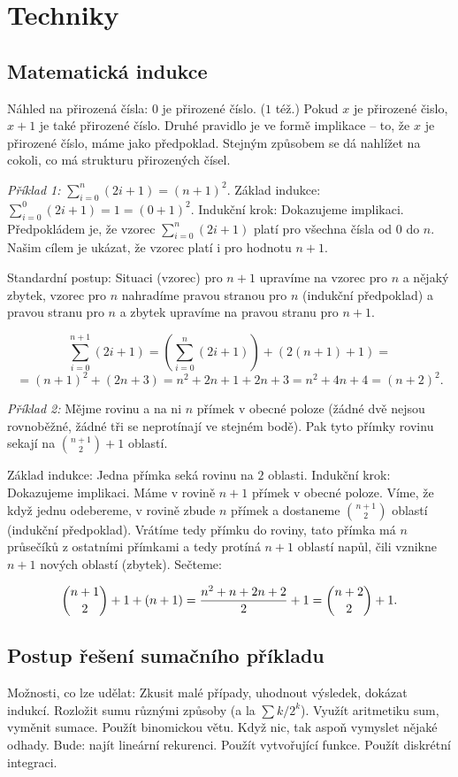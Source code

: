 \vfill\eject
\section{Techniky}

\subsection{Matematická indukce}

Náhled na přirozená čísla:
\itemize\ibull
\: $0$ je přirozené číslo. ($1$ též.)
\: Pokud $x$ je přirozené čislo, $x+1$ je také přirozené číslo.
\endlist
Druhé pravidlo je ve formě implikace -- to, že $x$ je přirozené číslo,
máme  jako předpoklad. Stejným způsobem se dá nahlížet na
cokoli, co má  strukturu přirozených čísel.

{\it Příklad 1:} $\sum_{i=0}^n (2i+1) = (n+1)^2$.
\itemize\ibull
\: Základ indukce: $\sum_{i=0}^0 (2i+1) = 1 = (0+1)^2$.
\: Indukční krok: Dokazujeme implikaci. Předpokládem je, že vzorec $\sum_{i=0}^n (2i+1)$ platí pro všechna čísla od $0$ do $n$. Našim cílem je ukázat, že vzorec platí i pro hodnotu $n+1$.

Standardní postup: Situaci (vzorec) pro $n+1$ upravíme na vzorec pro $n$ a nějaký zbytek,
vzorec pro $n$ nahradíme pravou stranou pro $n$ (indukční předpoklad) a pravou stranu pro $n$
a zbytek upravíme na pravou stranu pro $n+1$. 
\endlist

$$ \sum_{i=0}^{n+1} (2i+1) = \left( \sum_{i=0}^n (2i+1) \right) + \left(2(n+1)+1\right) = $$
$$ = (n+1)^2 + (2n+3) = n^2 + 2n +1 + 2n + 3 = n^2 + 4n + 4 = (n+2)^2. $$

{\it Příklad 2:} Mějme rovinu a na ni $n$ přímek v obecné poloze
(žádné dvě nejsou rovnoběžné, žádné tři se neprotínají ve stejném
bodě). Pak tyto přímky rovinu sekají na ${n+1 \choose 2} + 1$ oblastí.

\itemize\ibull
\: Základ indukce: Jedna přímka seká rovinu na $2$ oblasti.
\: Indukční krok: Dokazujeme implikaci. Máme v rovině $n+1$ přímek v
obecné poloze. Víme, že když jednu odebereme, v rovině zbude $n$
přímek a dostaneme ${n+1 \choose 2}$ oblastí (indukční
předpoklad). Vrátíme tedy přímku do roviny, tato přímka má $n$
průsečíků z ostatními přímkami a tedy protíná $n+1$ oblastí napůl,
čili vznikne $n+1$ nových oblastí (zbytek). Sečteme:
\endlist

$${n+1 \choose 2} + 1 + (n+1) = {n^2 + n + 2n + 2 \over 2} + 1 = {n+2 \choose 2} + 1.$$ 

\subsection{Postup řešení sumačního příkladu}
Možnosti, co lze udělat:
\itemize\ibull
\: Zkusit malé případy, uhodnout výsledek, dokázat indukcí.
\: Rozložit sumu různými způsoby (a la $\sum k/2^k$).
\: Využít aritmetiku sum, vyměnit sumace.
\: Použít binomickou větu.
\: Když nic, tak aspoň vymyslet nějaké odhady.
\: Bude: najít lineární rekurenci.
\: Použít vytvořující funkce.
\: Použít diskrétní integraci.
\endlist

